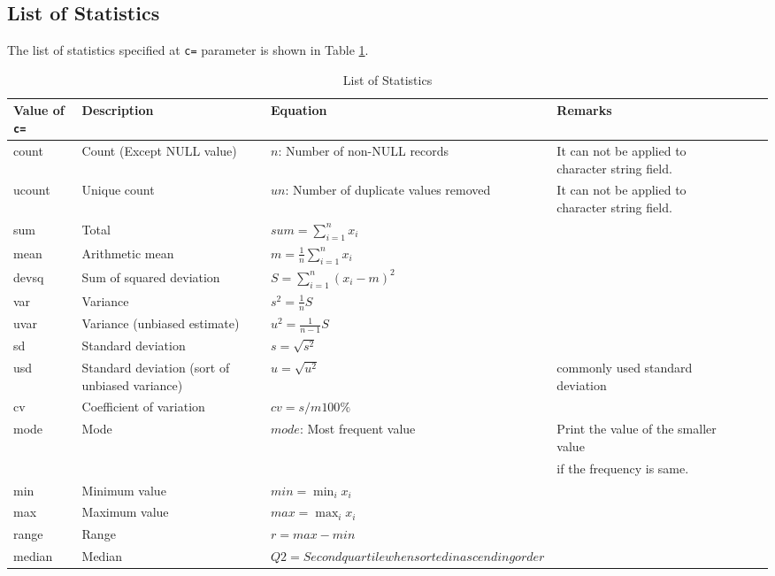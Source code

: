 \subsection*{List of Statistics }

The list of statistics specified at \verb|c=| parameter is shown in Table \ref{tbl:msummary}. 

\begin{table}[t]
\caption{List of Statistics \label{tbl:msummary}}
{\small
\renewcommand{\arraystretch}{1.5}
\begin{tabular}{lp{4cm}lp{4cm}lp{3cm}l}
\hline
Value of \verb|c=| & Description & Equation & Remarks \\  
\hline
count  & Count (Except NULL value) & $n$: Number of non-NULL records & It can not be applied to character string field.\\
ucount & Unique count     & $un$: Number of duplicate values removed &  It can not be applied to character string field. \\
sum    & Total             & $sum=\sum_{i=1}^n x_i$ & \\
mean   & Arithmetic mean           & $m=\frac{1}{n}\sum_{i=1}^n x_i$ & \\
devsq  & Sum of squared deviation       & $S=\sum_{i=1}^n(x_i-m)^2$ & \\
var    & Variance             & $s^2=\frac{1}{n}S$ & \\
uvar   & Variance (unbiased estimate) & $u^2=\frac{1}{n-1}S$ & \\
sd     & Standard deviation         & $s=\sqrt{s^2}$ & \\
usd    & Standard deviation (sort of unbiased variance) & $u=\sqrt{u^2}$ & commonly used standard deviation \\  
cv     & Coefficient of variation       & $cv=s/m100\%$ & \\
mode   & Mode           & $mode$: Most frequent value & Print the value of the smaller value\\
       &                  &                   & if the frequency is same. \\
min    & Minimum value            & $min=\min_i x_i$ & \\
max    & Maximum value          & $max=\max_i x_i$ & \\
range  & Range            & $r=max-min$  & \\
median & Median           & $Q2=Second quartile when sorted in ascending order$ & \\

\end{tabular}}
\end{table}
